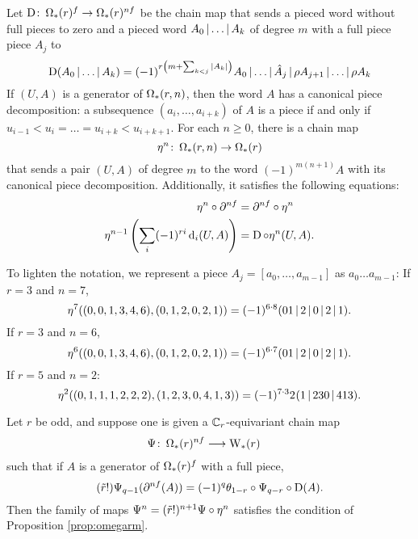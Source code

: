 Let $\operatorname{D} \colon \operatorname{\Omega}_{*}(r)^{f} \to \operatorname{\Omega}_{*}(r)^{nf}$ be the chain map that sends a pieced word without full pieces to zero and a pieced word $A_0\operatorname{|}\dots\operatorname{|} A_k$ of degree $m$ with a full piece piece $A_j$ to
\[
\operatorname{D}(A_0\operatorname{|} \dots\operatorname{|} A_k) = (-1)^{r\left(m+\sum_{k<j} |A_k|\right)} A_0\operatorname{|} \dots\operatorname{|} \hat{A}_{j}\operatorname{|} \rho A_{j+1}\operatorname{|} \dots\operatorname{|} \rho A_k
\]
If $(U,A)$ is a generator of $\operatorname{\Omega}_{*}(r,n)$, then the word $A$ has a canonical piece decomposition: a subsequence $(a_i,\dots,a_{i+k})$ of $A$ is a piece if and only if $u_{i-1}<u_i =\dots= u_{i+k}<u_{i+k+1}$. For each $n \geq 0$, there is a chain map
\[\eta^n \colon \operatorname{\Omega}_{*}(r,n) \to \operatorname{\Omega}_{*}(r)\]
that sends a pair $(U,A)$ of degree $m$ to the word $(-1)^{m(n+1)}A$ with its canonical piece decomposition. Additionally, it satisfies the following equations:
\begin{align}\label{eq:lambda2}
\eta^n\circ \partial^{nf} &= \partial^{nf}\circ \eta^n
\\
\label{eq:lambda0}
	\eta^{n-1}\left(\sum_i (-1)^{ri}\operatorname{d}_i(U,A)\right) &= \operatorname{D}\circ \eta^n(U,A).
\end{align}
%
\begin{example}\label{example:omegar} To lighten the notation, we represent a piece $A_j = [a_0,\dots,a_{m-1}]$ as $a_0\dots a_{m-1}$: If $r=3$ and $n=7$,
	\[
		\eta^7((0,0,1,3,4,6),(0,1,2,0,2,1)) = (-1)^{6\cdot 8}(01\operatorname{|} 2\operatorname{|} 0\operatorname{|} 2\operatorname{|} 1).
	\]
	If $r=3$ and $n=6$,
	\[
		\eta^6((0,0,1,3,4,6),(0,1,2,0,2,1)) = (-1)^{6\cdot 7}(01\operatorname{|} 2\operatorname{|} 0\operatorname{|} 2\operatorname{|} 1).
	\]
	If $r=5$ and $n=2$:
	\[
		\eta^2((0,1,1,1,2,2,2),(1,2,3,0,4,1,3)) = (-1)^{7\cdot 3} 2^{}(1\operatorname{|} 230\operatorname{|} 413).
	\]
\end{example}

\begin{lemma}\label{lemma:omegar}
	Let $r$ be odd, and suppose one is given a $\mathbb{C}_r$-equivariant chain map
	\begin{align*}
		\Psi \colon \operatorname{\Omega}_{*}(r)^{nf}& \longrightarrow \operatorname{W}_{*}(r)
	\end{align*}
	such that if $A$ is a generator of $\operatorname{\Omega}_{*}(r)^{f}$ with a full piece,
	\begin{equation}\label{eq:lambda}
		(\tilde{r}!)\Psi_{q-1}(\partial^{nf} (A)) = (-1)^q\theta_{1-r}\circ\Psi_{q-r}\circ\operatorname{D}(A).
	\end{equation}
	Then the family of maps $\Psi^n = (\tilde{r}!)^{n+1}\Psi\circ \eta^n$ satisfies the condition of Proposition \ref{prop:omegarm}.
\end{lemma}

